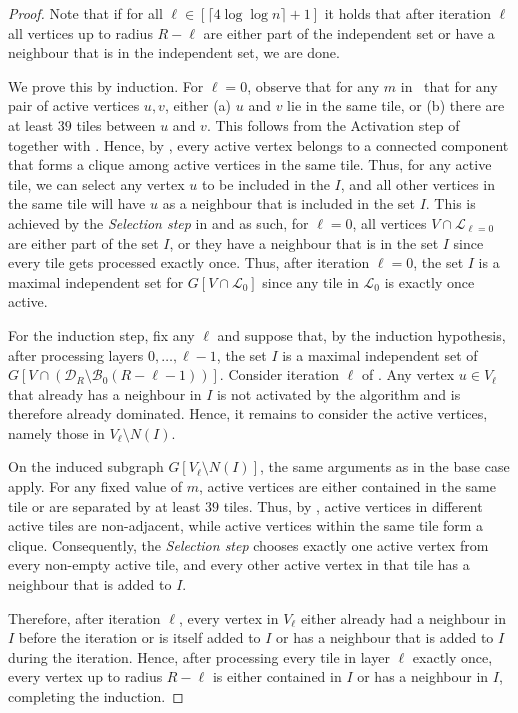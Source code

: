 \documentclass[letterpaper,11pt]{article}
\newcommand{\B}{\mathcal B}
\newcommand{\disk}{\ensuremath{\mathcal D_R}\xspace}
\newcommand{\1}{\mathbb I}
\newcommand{\Layer}[1]{\mathcal{L}_{#1}}
\begin{document}
%
\begin{proof}
    Note that if for all $\ell \in [\lceil 4\log\log n\rceil + 1]$ it holds that after iteration $\ell$ all vertices up to radius $R - \ell$ are either part of the independent set or have a neighbour that is in the independent set, we are done.
    
We prove this by induction. For $\ell = 0$, observe that for any $m$ in~ that for any pair of active vertices $u,v$, either (a) $u$ and $v$ lie in the same tile, or (b) there are at least $39$ tiles between $u$ and $v$. This follows from the Activation step of \algomis together with . Hence, by , every active vertex belongs to a connected component that forms a clique among active vertices in the same tile. Thus, for any active tile, we can select any vertex $u$ to be included in the $I$, and all other vertices in the same tile will have $u$ as a neighbour that is included in the set $I$. This is achieved by the \emph{Selection step} in \algomis and as such, for $\ell = 0$, all vertices $V \cap \Layer{\ell = 0}$ are either part of the set $I$, or they have a neighbour that is in the set $I$ since every tile gets processed exactly once. Thus, after iteration $\ell = 0$, the set $I$ is a maximal independent set for $G[V \cap \Layer{0}]$ since any tile in $\Layer{0}$ is exactly once active.

For the induction step, fix any $\ell$ and suppose that, by the induction hypothesis, after processing layers $0,\dots,\ell-1$, the set $I$ is a maximal independent set of
$
G\left[V \cap \left(\disk \setminus \B_0(R-\ell-1)\right)\right].
$
Consider iteration $\ell$ of . Any vertex $u \in V_\ell$ that already has a neighbour in $I$ is not activated by the algorithm and is therefore already dominated. Hence, it remains to consider the active vertices, namely those in $V_\ell \setminus N(I)$.

On the induced subgraph $G[V_\ell \setminus N(I)]$, the same arguments as in the base case apply. For any fixed value of $m$, active vertices are either contained in the same tile or are separated by at least $39$ tiles. Thus, by , active vertices in different active tiles are non-adjacent, while active vertices within the same tile form a clique. Consequently, the \emph{Selection step} chooses exactly one active vertex from every non-empty active tile, and every other active vertex in that tile has a neighbour that is added to $I$.

Therefore, after iteration $\ell$, every vertex in $V_\ell$ either already had a neighbour in $I$ before the iteration or is itself added to $I$ or has a neighbour that is added to $I$ during the iteration. Hence, after processing every tile in layer $\ell$ exactly once, every vertex up to radius $R-\ell$ is either contained in $I$ or has a neighbour in $I$, completing the induction.
\end{proof}
\end{document}
